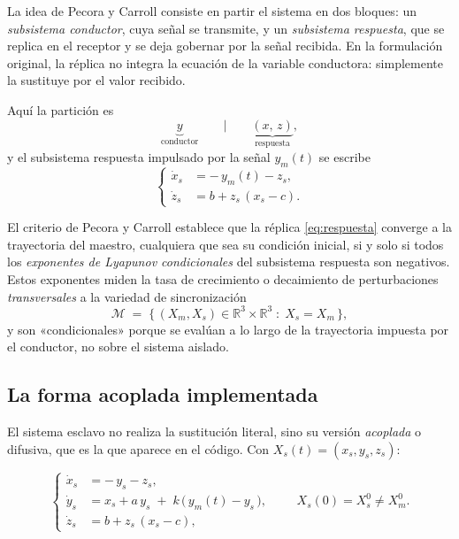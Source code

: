 \documentclass[12pt,a4paper]{article}
\newcommand{\R}{\mathbb{R}}
\begin{document}
La idea de Pecora y Carroll consiste en partir el sistema en dos bloques: un
\emph{subsistema conductor}, cuya señal se transmite, y un \emph{subsistema
respuesta}, que se replica en el receptor y se deja gobernar por la señal recibida.
En la formulación original, la réplica no integra la ecuación de la variable
conductora: simplemente la sustituye por el valor recibido.

Aquí la partición es
\[
  \underbrace{y}_{\text{conductor}}
  \qquad\Big|\qquad
  \underbrace{(x,\,z)}_{\text{respuesta}} ,
\]
y el subsistema respuesta impulsado por la señal $y_m(t)$ se escribe
\begin{equation}
\label{eq:respuesta}
\left\{
\begin{aligned}
  \dot{x}_s &= -\,y_m(t) - z_s,\\
  \dot{z}_s &= b + z_s\,(x_s - c).
\end{aligned}
\right.
\end{equation}

El criterio de Pecora y Carroll establece que la réplica \eqref{eq:respuesta}
converge a la trayectoria del maestro, cualquiera que sea su condición inicial,
si y solo si todos los \emph{exponentes de Lyapunov condicionales} del subsistema
respuesta son negativos. Estos exponentes miden la tasa de crecimiento o
decaimiento de perturbaciones \emph{transversales} a la variedad de sincronización
\[
  \mathcal{M} \;=\; \bigl\{\,(X_m, X_s) \in \R^3\times\R^3 \;:\; X_s = X_m \,\bigr\},
\]
y son «condicionales» porque se evalúan a lo largo de la trayectoria impuesta por
el conductor, no sobre el sistema aislado.

\subsection{La forma acoplada implementada}

El sistema esclavo no realiza la sustitución literal, sino su versión
\emph{acoplada} o difusiva, que es la que aparece en el código. Con
$X_s(t)=(x_s,y_s,z_s)$:

\begin{equation}
\label{eq:esclavo}
\boxed{
\left\{
\begin{aligned}
  \dot{x}_s &= -\,y_s - z_s,\\
  \dot{y}_s &= x_s + a\,y_s \;+\; k\,\bigl(\,y_m(t) - y_s\,\bigr),\\
  \dot{z}_s &= b + z_s\,(x_s - c),
\end{aligned}
\right.}
\qquad X_s(0) = X_s^{0} \neq X_m^{0}.
\end{equation}
\end{document}
